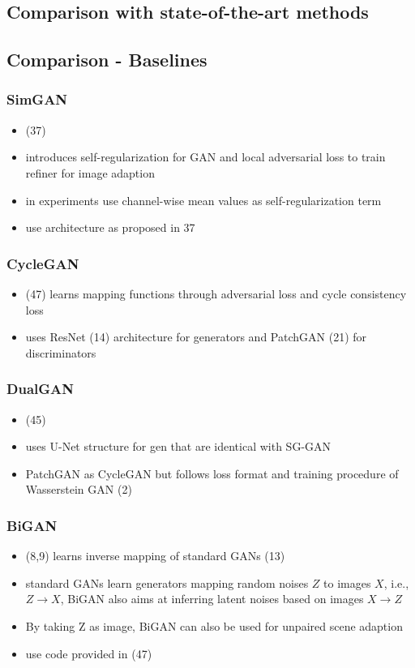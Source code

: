 \subsection{Comparison with state-of-the-art methods}
\subsection{Comparison - Baselines}
\subsubsection{SimGAN}
\begin{itemize}
	\item (37)
	\item introduces self-regularization for GAN and local adversarial loss to train refiner for image adaption
	\item in experiments use channel-wise mean values as self-regularization term
	\item use architecture as proposed in 37
\end{itemize}

\subsubsection{CycleGAN}
\begin{itemize}
	\item (47) learns mapping functions through adversarial loss and cycle consistency loss
	\item uses ResNet (14) architecture for generators and PatchGAN (21) for discriminators
\end{itemize}

\subsubsection{DualGAN}
\begin{itemize}
	\item (45)
	\item uses U-Net structure for gen that are identical with SG-GAN
	\item PatchGAN as CycleGAN but follows loss format and training procedure of Wasserstein GAN (2)
\end{itemize}

\subsubsection{BiGAN}
\begin{itemize}
	\item (8,9) learns inverse mapping of standard GANs (13)
	\item standard GANs learn generators mapping random noises $Z$ to images $X$, i.e., $Z \rightarrow X$, BiGAN also aims at inferring latent noises based on images $X\rightarrow Z$
	\item By taking Z as image, BiGAN can also be used for unpaired scene adaption
	\item use code provided in (47)
\end{itemize}

